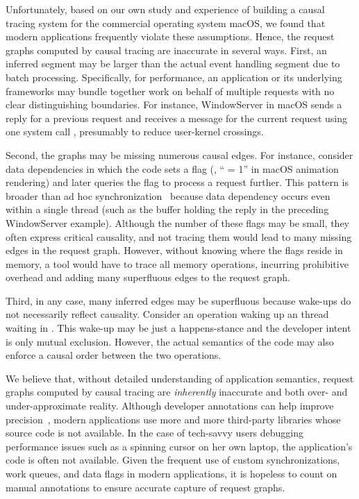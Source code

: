Unfortunately, based on our own study and experience of building a causal
tracing system for the commercial operating system macOS, we found that modern
applications frequently violate these assumptions. Hence, the request graphs
computed by causal tracing are inaccurate in several ways.  First, an inferred
segment may be larger than the actual event handling segment due to batch
processing.  Specifically, for performance, an application or its underlying
frameworks may bundle together work on behalf of multiple requests with no
clear distinguishing boundaries.  For instance, WindowServer in macOS sends a
reply for a previous request and receives a message for the current request
using one system call , presumably to reduce
user-kernel crossings.

Second, the graphs may be missing numerous causal edges.  For instance,
consider data dependencies in which the code sets a flag (\eg,
`` = 1'' in macOS animation rendering) and later queries
the flag to process a request further.  This pattern is broader than ad
hoc synchronization~\cite{xiong2010ad} because data dependency occurs even
within a single thread (such as the buffer holding the reply in the
preceding WindowServer example).  Although the
number of these flags may be small, they often express
critical causality, and not tracing them would lead to many missing edges in
the request graph.  However, without knowing where the flags reside in memory,
a tool would have to trace all memory operations, incurring prohibitive
overhead and adding many superfluous edges to the request graph.

Third, in any case, many inferred edges may be superfluous because wake-ups do
not necessarily reflect causality.  Consider an  operation waking
up an thread waiting in .  This wake-up may be just a happens-stance
and the developer intent is only mutual exclusion.  However, the actual
semantics of the code may also enforce a causal order between the two
operations.

We believe that, without detailed understanding of application semantics,
request graphs computed by causal tracing are \emph{inherently} inaccurate and
both over- and under-approximate reality.  Although developer annotations can
help improve precision~\cite{barham2004using, reynolds2006pip}, modern
applications use more and more third-party libraries whose source code is not
available.  In the case of tech-savvy users debugging performance issues such
as a spinning cursor on her own laptop, the application's code is
often not available.  Given the frequent use of custom synchronizations, work
queues, and data flags in modern applications, it is hopeless to count on
manual annotations to ensure accurate capture of request graphs.


